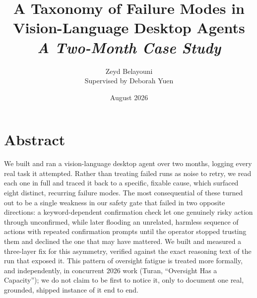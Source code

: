 \documentclass[11pt]{article}
\title{
  {\Huge\bfseries\color{navy} A Taxonomy of Failure Modes in\\ Vision-Language Desktop Agents}\\[0.4cm]
  {\Large\itshape\color{muted} A Two-Month Case Study}
}
\author{Zeyd Belayouni \\ \small\color{muted} Supervised by Deborah Yuen}
\date{August 2026}
\begin{document}
\maketitle
\newpage
\tableofcontents
\newpage
\section*{Abstract}
We built and ran a vision-language desktop agent over two months, logging every real task it attempted. Rather than treating failed runs as noise to retry, we read each one in full and traced it back to a specific, fixable cause, which surfaced eight distinct, recurring failure modes. The most consequential of these turned out to be a single weakness in our safety gate that failed in two opposite directions: a keyword-dependent confirmation check let one genuinely risky action through unconfirmed, while later flooding an unrelated, harmless sequence of actions with repeated confirmation prompts until the operator stopped trusting them and declined the one that may have mattered. We built and measured a three-layer fix for this asymmetry, verified against the exact reasoning text of the run that exposed it. This pattern of oversight fatigue is treated more formally, and independently, in concurrent 2026 work (Turan, ``Oversight Has a Capacity''); we do not claim to be first to notice it, only to document one real, grounded, shipped instance of it end to end.
\end{document}
